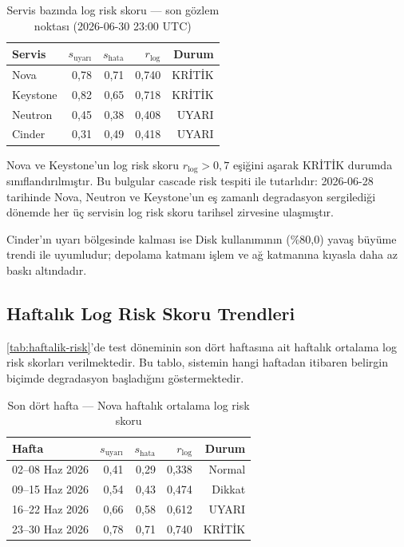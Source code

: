\begin{table}[htbp]
    \centering
    \caption{Servis bazında log risk skoru — son gözlem noktası (2026-06-30 23:00 UTC)}
    \label{tab:servis-risk}
    \begin{tabular}{lrrrr}
        \textbf{Servis} & \textbf{$s_{\text{uyarı}}$} & \textbf{$s_{\text{hata}}$} & \textbf{$r_{\text{log}}$} & \textbf{Durum} \\
        \hline
        Nova      & 0{,}78 & 0{,}71 & 0{,}740 & KRİTİK \\
        Keystone  & 0{,}82 & 0{,}65 & 0{,}718 & KRİTİK \\
        Neutron   & 0{,}45 & 0{,}38 & 0{,}408 & UYARI  \\
        Cinder    & 0{,}31 & 0{,}49 & 0{,}418 & UYARI  \\
    \end{tabular}
\end{table}

Nova ve Keystone'un log risk skoru $r_{\text{log}} > 0{,}7$ eşiğini aşarak KRİTİK durumda sınıflandırılmıştır.
Bu bulgular cascade risk tespiti ile tutarlıdır: 2026-06-28 tarihinde Nova, Neutron ve Keystone'un eş zamanlı degradasyon sergilediği dönemde her üç servisin log risk skoru tarihsel zirvesine ulaşmıştır.

Cinder'ın uyarı bölgesinde kalması ise Disk kullanımının (\%80{,}0) yavaş büyüme trendi ile uyumludur; depolama katmanı işlem ve ağ katmanına kıyasla daha az baskı altındadır.

\subsection{Haftalık Log Risk Skoru Trendleri}

\autoref{tab:haftalik-risk}'de test döneminin son dört haftasına ait haftalık ortalama log risk skorları verilmektedir.
Bu tablo, sistemin hangi haftadan itibaren belirgin biçimde degradasyon başladığını göstermektedir.

\begin{table}[htbp]
    \centering
    \caption{Son dört hafta — Nova haftalık ortalama log risk skoru}
    \label{tab:haftalik-risk}
    \begin{tabular}{lrrrr}
        \textbf{Hafta} & \textbf{$s_{\text{uyarı}}$} & \textbf{$s_{\text{hata}}$} & \textbf{$r_{\text{log}}$} & \textbf{Durum} \\
        \hline
        02--08 Haz 2026 & 0{,}41 & 0{,}29 & 0{,}338 & Normal  \\
        09--15 Haz 2026 & 0{,}54 & 0{,}43 & 0{,}474 & Dikkat  \\
        16--22 Haz 2026 & 0{,}66 & 0{,}58 & 0{,}612 & UYARI   \\
        23--30 Haz 2026 & 0{,}78 & 0{,}71 & 0{,}740 & KRİTİK  \\
    \end{tabular}
\end{table}

